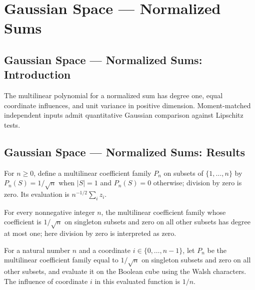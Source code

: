 \section{Gaussian Space --- Normalized Sums}
\subsection*{Gaussian Space --- Normalized Sums: Introduction}
The multilinear polynomial for a normalized sum has degree one, equal coordinate influences, and unit variance in positive dimension. Moment-matched independent inputs admit quantitative Gaussian comparison against Lipschitz tests.

\subsection*{Gaussian Space --- Normalized Sums: Results}

\begin{definition}
\leanok
{}
For $n\ge0$, define a multilinear coefficient family $P_n$ on subsets of $\{1,\ldots,n\}$ by $P_n(S)=1/\sqrt n$ when $|S|=1$ and $P_n(S)=0$ otherwise; division by zero is zero. Its evaluation is $n^{-1/2}\sum_i z_i$.
\end{definition}

\begin{lemma}
\leanok
{}
For every nonnegative integer $n$, the multilinear coefficient family whose coefficient
is $1/\sqrt n$ on singleton subsets and zero on all other subsets has degree at most
one; here division by zero is interpreted as zero.
\end{lemma}

\begin{lemma}
\leanok
{}
For a natural number $n$ and a coordinate $i\in\{0,\ldots,n-1\}$, let $P_n$ be the
multilinear coefficient family equal to $1/\sqrt n$ on singleton subsets and zero on all
other subsets, and evaluate it on the Boolean cube using the Walsh characters. The
influence of coordinate $i$ in this evaluated function is $1/n$.
\end{lemma}

